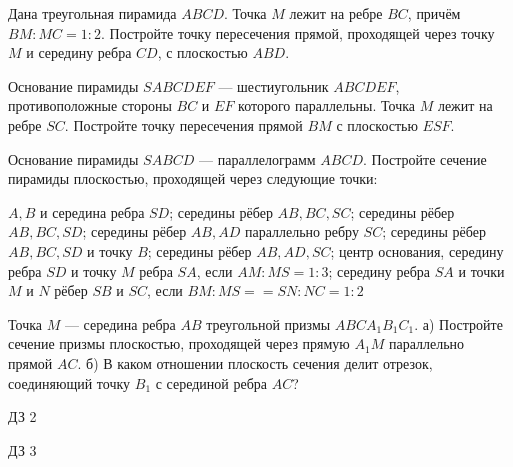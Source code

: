\begin{homework}[number=1]
	\begin{listofex}
		\item Дана треугольная пирамида \(ABCD\). Точка \(M\) лежит на ребре \(BC\), причём \(BM:MC = 1:2\). Постройте точку пересечения прямой, проходящей через точку \(M\) и середину ребра \(CD\), с плоскостью \(ABD\).
		\item Основание пирамиды \(SABCDEF\) --- шестиугольник \(ABCDEF\), противоположные стороны \(BC\) и \(EF\) которого параллельны. Точка \(M\) лежит на ребре \(SC\). Постройте точку пересечения прямой \(BM\) с плоскостью \(ESF\).
		\item Основание пирамиды \(SABCD\) --- параллелограмм \(ABCD\). Постройте сечение пирамиды плоскостью, проходящей через следующие точки:
		\begin{itasks}[1]
			\task \(A, B\) и середина ребра \(SD\);
			\task середины рёбер \(AB, BC, SC\);
			\task середины рёбер \(AB, BC, SD\);
			\task середины рёбер \(AB, AD\) параллельно ребру \(SC\);
			\task середины рёбер \(AB, BC, SD\) и точку \(B\);
			\task середины рёбер \(AB, AD, SC\);
			\task центр основания, середину ребра \(SD\) и точку \(M\) ребра \(SA\), если \(AM:MS = 1:3\);
			\task середину ребра \(SA\) и точки \(M\) и \(N\) рёбер \(SB\) и \(SC\), если \(BM : MS = = SN :NC=1:2\)
		\end{itasks}
		\item Точка \(M\) — середина ребра \(AB\) треугольной призмы \(ABCA_1B_1C_1\). а) Постройте сечение призмы плоскостью, проходящей через прямую \(A_1M\) параллельно прямой \(AC\). б) В каком отношении плоскость сечения делит отрезок, соединяющий точку \(B_1\) с серединой ребра \(AC\)?
	\end{listofex}
\end{homework}

\begin{homework}[number=2]
	\begin{listofex}
		\item ДЗ 2
	\end{listofex}
\end{homework}

\begin{homework}[number=3]
	\begin{listofex}
		\item ДЗ 3
	\end{listofex}
\end{homework}

